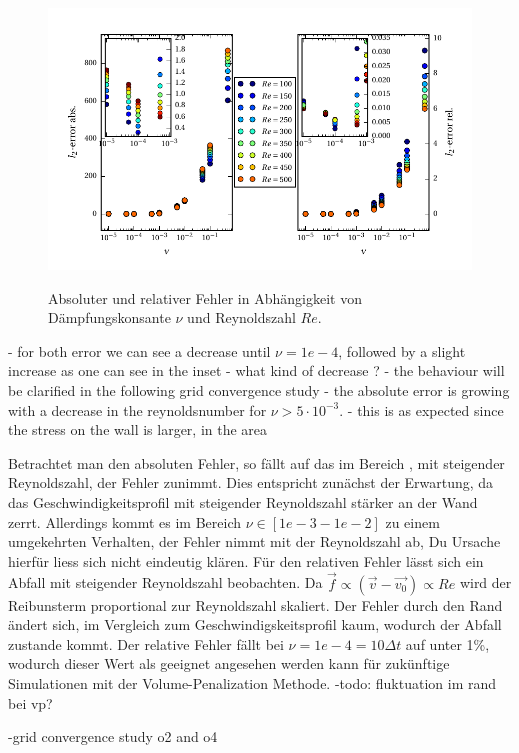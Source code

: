 \begin{figure}[!bpt]
  \centering
  \includegraphics{gfx/immersed_boundary/2_vp/vp_error.pdf}\label{fig:vp_error}
  \caption{Absoluter und relativer Fehler in Abhängigkeit von Dämpfungskonsante $\nu$ und Reynoldszahl $Re$.}
\end{figure}

- for both error we can see a decrease until $\nu=1e-4$, followed by a slight increase as one can see in the inset
- what kind of decrease ?
- the behaviour will be clarified in the following grid convergence study
- the absolute error is growing with a decrease in the reynoldsnumber for $\nu>5\cdot10^{-3}$.
- this is as expected since the stress on the wall is larger, in the area

Betrachtet man den absoluten Fehler, so fällt auf das im Bereich , mit steigender Reynoldszahl, der Fehler zunimmt.
Dies entspricht zunächst der Erwartung, da das Geschwindigkeitsprofil mit steigender Reynoldszahl stärker an der Wand zerrt.
Allerdings kommt es im Bereich $\nu \in [1e-3 - 1e-2]$ zu einem umgekehrten Verhalten, der Fehler nimmt mit der Reynoldszahl ab,
Du Ursache hierfür liess sich nicht eindeutig klären.
Für den relativen Fehler lässt sich ein Abfall mit steigender Reynoldszahl beobachten. Da $\vec{f} \propto (\vec{v}-\vec{v_0})  \propto Re$ wird der Reibunsterm
proportional zur Reynoldszahl skaliert. Der Fehler durch den Rand ändert sich, im Vergleich zum Geschwindigskeitsprofil kaum, wodurch der Abfall zustande kommt.
Der relative Fehler fällt bei $\nu=1e-4=10\Delta t$ auf unter 1\%, wodurch dieser Wert als geeignet angesehen werden kann für zukünftige Simulationen mit der Volume-Penalization Methode.
-todo: fluktuation im rand bei vp?

-grid convergence study o2 and o4


